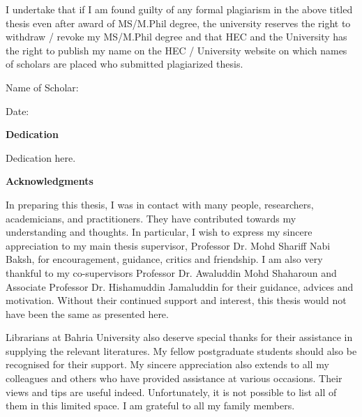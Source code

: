 I undertake that if I am found guilty of any formal plagiarism in the above titled thesis even after award of MS/M.Phil degree, the university reserves the right to withdraw / revoke my MS/M.Phil degree and that HEC and the
University has the right to publish my name on the HEC / University website on which names of scholars are placed who submitted plagiarized thesis.

\vskip 0.2in

\hspace{50mm}Name of Scholar: \AuthorName

\vskip 0.1in

\hspace{50mm}Date:


\newpage
{}
\begin{center}
	\large \textbf{Dedication}
\end{center}
\vskip 3in
\begin{flushright}
	Dedication here.
\end{flushright}


\newpage
{}
\begin{center}
	\large \textbf{Acknowledgments}
\end{center}
\vskip 0.45in
In preparing this thesis, I was in contact with many people, researchers,
academicians, and practitioners. They have contributed towards my understanding and
thoughts. In particular, I wish to express my sincere appreciation to my main thesis
supervisor, Professor Dr. Mohd Shariff Nabi Baksh, for encouragement, guidance, critics
and friendship. I am also very thankful to my co-supervisors Professor Dr. Awaluddin
Mohd Shaharoun and Associate Professor Dr. Hishamuddin Jamaluddin for their
guidance, advices and motivation. Without their continued support and interest, this
thesis would not have been the same as presented here.

Librarians at Bahria University also deserve special thanks for their
assistance in supplying the relevant literatures. My fellow postgraduate students
should also be recognised for their support. My sincere appreciation also extends to
all my colleagues and others who have provided assistance at various occasions.
Their views and tips are useful indeed. Unfortunately, it is not possible to list all of
them in this limited space. I am grateful to all my family members.

